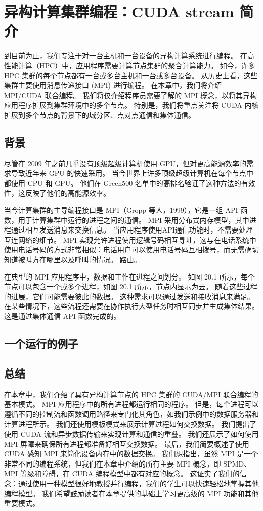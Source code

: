 \section{异构计算集群编程：CUDA stream 简介}
到目前为止，我们专注于对一台主机和一台设备的异构计算系统进行编程。 在高性能计算（HPC）中，应用程序需要计算节点集群的聚合计算能力。 如今，许多 HPC 集群的每个节点都有一台或多台主机和一台或多台设备。 从历史上看，这些集群主要使用消息传递接口 (MPI) 进行编程。 在本章中，我们将介绍 MPI/CUDA 联合编程。 我们将仅介绍程序员需要了解的 MPI 概念，以将其异构应用程序扩展到集群环境中的多个节点。 特别是，我们将重点关注将 CUDA 内核扩展到多个节点的背景下的域分区、点对点通信和集体通信。

\subsection{背景}
尽管在 2009 年之前几乎没有顶级超级计算机使用 GPU，但对更高能源效率的需求导致近年来 GPU 的快速采用。 当今世界上许多顶级超级计算机在每个节点中都使用 CPU 和 GPU。 他们在 Green500 名单中的高排名验证了这种方法的有效性，这反映了他们的高能源效率。

当今计算集群的主导编程接口是 MPI（Gropp 等人，1999），它是一组 API 函数，用于计算集群中运行的进程之间的通信。 MPI 采用分布式内存模型，其中进程通过相互发送消息来交换信息。 当应用程序使用API通信功能时，不需要处理互连网络的细节。 MPI 实现允许进程使用逻辑号码相互寻址，这与在电话系统中使用电话号码的方式非常相似：电话用户可以使用电话号码互相拨号，而无需确切知道被叫方在哪里以及呼叫的情况。 路由。

在典型的 MPI 应用程序中，数据和工作在进程之间划分。 如图 20.1 所示，每个节点可以包含一个或多个进程，如图 20.1 所示，节点内显示为云。 随着这些过程的进展，它们可能需要彼此的数据。 这种需求可以通过发送和接收消息来满足。 在某些情况下，这些流程还需要在协作执行大型任务时相互同步并生成集体结果。 这是通过集体通信 API 函数完成的。

\subsection{一个运行的例子}

\subsection{总结}
在本章中，我们介绍了具有异构计算节点的 HPC 集群的 CUDA/MPI 联合编程的基本模式。 MPI 应用程序中的所有进程都运行相同的程序。 但是，每个进程可以遵循不同的控制流和函数调用路径来专门化其角色，如我们示例中的数据服务器和计算进程所示。 我们还使用模板模式来展示计算过程如何交换数据。 我们提出了使用 CUDA 流和异步数据传输来实现计算和通信的重叠。 我们还展示了如何使用 MPI 屏障来确保所有进程都准备好相互交换数据。 最后，我们简要概述了使用 CUDA 感知 MPI 来简化设备内存中的数据交换。 我们想指出，虽然 MPI 是一个非常不同的编程系统，但我们在本章中介绍的所有主要 MPI 概念，即 SPMD、MPI 等级和障碍，在 CUDA 编程模型中都有对应的概念。 这证实了我们的信念：通过使用一种模型很好地教授并行编程，我们的学生可以快速轻松地掌握其他编程模型。 我们希望鼓励读者在本章提供的基础上学习更高级的 MPI 功能和其他重要模式。
